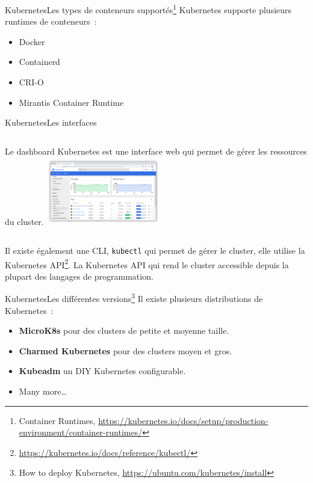 \documentclass{beamer}
\begin{document}
    \begin{frame}{Kubernetes}{Les types de conteneurs supportés\footnote{Container Runtimes, \url{https://kubernetes.io/docs/setup/production-environment/container-runtimes/}}}
        Kubernetes supporte plusieurs runtimes de conteneurs~:
        \begin{itemize}
            \item Docker
            \item Containerd
            \item CRI-O
            \item Mirantis Container Runtime
        \end{itemize}
    \end{frame}

    \begin{frame}{Kubernetes}{Les interfaces}
        \begin{columns}
            Le dashboard Kubernetes est une interface web qui permet de gérer les ressources du cluster\footnotemark.
            \centering
            \includegraphics[width=5cm]{image/kubernetes-dashboard}
        \end{columns}
        \flushleft
        \bigbreak
        Il existe également une CLI, \lstinline{kubectl} qui permet de gérer le cluster, elle utilise la Kubernetes API\footnote{\url{https://kubernetes.io/docs/reference/kubectl/}}.
        \bigbreak
        La Kubernetes API qui rend le cluster accessible depuis la plupart des langages de programmation.
    \end{frame}

    \begin{frame}{Kubernetes}{Les différentes versions\footnote{How to deploy Kubernetes, \url{https://ubuntu.com/kubernetes/install}}}
        Il existe plusieurs distributions de Kubernetes~:
        \begin{itemize}
            \item \textbf{MicroK8s} pour des clusters de petite et moyenne taille.
            \item \textbf{Charmed Kubernetes} pour des clusters moyen et gros.
            \item \textbf{Kubeadm} un DIY Kubernetes configurable.
            \item Many more\ldots
        \end{itemize}
    \end{frame}
\end{document}
